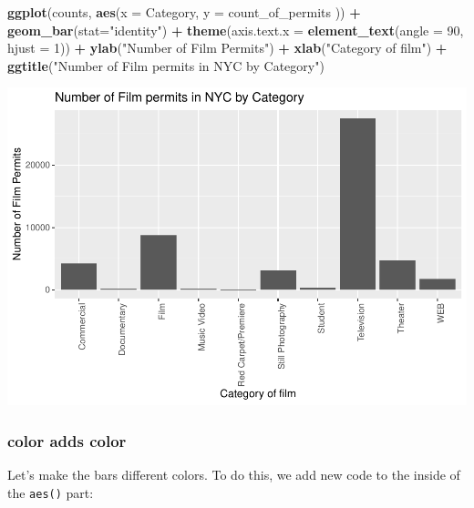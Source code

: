 \documentclass[]{book}
\newenvironment{Shaded}{\begin{snugshade}}{\end{snugshade}}
\newcommand{\KeywordTok}[1]{\textcolor[rgb]{0.13,0.29,0.53}{\textbf{#1}}}
\newcommand{\DataTypeTok}[1]{\textcolor[rgb]{0.13,0.29,0.53}{#1}}
\newcommand{\DecValTok}[1]{\textcolor[rgb]{0.00,0.00,0.81}{#1}}
\newcommand{\StringTok}[1]{\textcolor[rgb]{0.31,0.60,0.02}{#1}}
\newcommand{\OperatorTok}[1]{\textcolor[rgb]{0.81,0.36,0.00}{\textbf{#1}}}
\newcommand{\NormalTok}[1]{#1}
\begin{document}
\begin{Shaded}
\begin{Highlighting}[]
\KeywordTok{ggplot}\NormalTok{(counts, }\KeywordTok{aes}\NormalTok{(}\DataTypeTok{x =}\NormalTok{ Category, }\DataTypeTok{y =}\NormalTok{ count_of_permits )) }\OperatorTok{+}
\StringTok{  }\KeywordTok{geom_bar}\NormalTok{(}\DataTypeTok{stat=}\StringTok{"identity"}\NormalTok{) }\OperatorTok{+}\StringTok{ }
\StringTok{  }\KeywordTok{theme}\NormalTok{(}\DataTypeTok{axis.text.x =} \KeywordTok{element_text}\NormalTok{(}\DataTypeTok{angle =} \DecValTok{90}\NormalTok{, }\DataTypeTok{hjust =} \DecValTok{1}\NormalTok{)) }\OperatorTok{+}
\StringTok{  }\KeywordTok{ylab}\NormalTok{(}\StringTok{"Number of Film Permits"}\NormalTok{) }\OperatorTok{+}\StringTok{ }
\StringTok{  }\KeywordTok{xlab}\NormalTok{(}\StringTok{"Category of film"}\NormalTok{) }\OperatorTok{+}
\StringTok{  }\KeywordTok{ggtitle}\NormalTok{(}\StringTok{"Number of Film permits in NYC by Category"}\NormalTok{)}
\end{Highlighting}
\end{Shaded}

\includegraphics{Statistics_Lab_files/figure-latex/1categoryE-1.pdf}

\subsubsection{color adds color}\label{color-adds-color}

Let's make the bars different colors. To do this, we add new code to the
inside of the \texttt{aes()} part:
\end{document}
